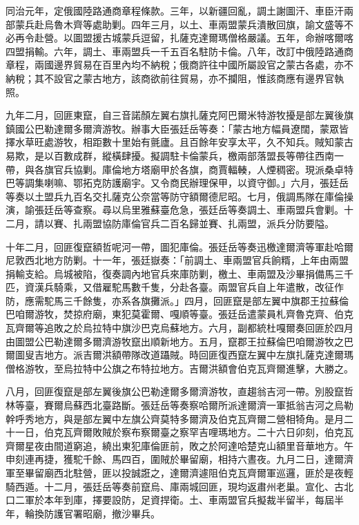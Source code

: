 \begin{pinyinscope}
同治元年，定俄國陸路通商章程條款。三年，以新疆回亂，調土謝圖汗、車臣汗兩部蒙兵赴烏魯木齊等處助剿。四年三月，以土、車兩盟蒙兵潰散回旗，諭文盛等不必再令赴營。以圖盟援古城蒙兵逗留，扎薩克達爾瑪僧格嚴議。五年，命辦喀爾喀四盟捐輸。六年，調土、車兩盟兵一千五百名駐防卡倫。八年，改訂中俄陸路通商章程，兩國邊界貿易在百里內均不納稅；俄商許往中國所屬設官之蒙古各處，亦不納稅；其不設官之蒙古地方，該商欲前往貿易，亦不攔阻，惟該商應有邊界官執照。

九年二月，回匪東竄，自三音諾顏左翼右旗扎薩克阿巴爾米特游牧擾是部左翼後旗鎮國公巴勒達爾多爾濟游牧。辦事大臣張廷岳等奏：「蒙古地方幅員遼闊，蒙眾皆擇水草旺處游牧，相距數十里始有氈廬。且百餘年安享太平，久不知兵。賊知蒙古易欺，是以百數成群，縱橫肆擾。擬調駐卡倫蒙兵，檄兩部落盟長等帶往西南一帶，與各旗官兵協剿。庫倫地方塔廟甲於各旗，商賈輻輳，人煙稠密。現派桑卓特巴等調集喇嘛、鄂拓克防護廟宇。又令商民辦理保甲，以資守御。」六月，張廷岳等奏以土盟兵九百名交扎薩克公奈當等防守額爾德尼昭。七月，俄調馬隊在庫倫操演，諭張廷岳等查察。尋以烏里雅蘇臺危急，張廷岳等奏調土、車兩盟兵會剿。十二月，請以賽、扎兩盟協防庫倫官兵二百名歸並賽、扎兩盟，派兵分防要隘。

十年二月，回匪復竄額哲呢河一帶，圖犯庫倫。張廷岳等奏迅檄達爾濟等軍赴哈爾尼敦西北地方防剿。十一年，張廷嶽奏：「前調土、車兩盟官兵餉糈，上年由兩盟捐輸支給。烏城被陷，復奏調內地官兵來庫防剿，檄土、車兩盟及沙畢捐備馬三千匹，資漢兵騎乘，又借雇駝馬數千隻，分赴各臺。兩盟官兵自上年遣散，改征作防，應需駝馬三千餘隻，亦系各旗攤派。」四月，回匪竄是部左翼中旗郡王拉蘇倫巴咱爾游牧，焚掠府廟，東犯莫霍爾、嘎順等臺。張廷岳遣蒙員札齊魯克齊、伯克瓦齊爾等追敗之於烏拉特中旗沙巴克烏蘇地方。六月，副都統杜嘎爾奏回匪於四月由圖盟公巴勒達爾多爾濟游牧竄出順新地方。五月，竄郡王拉蘇倫巴咱爾游牧之巴爾圖叟吉地方。派吉爾洪額帶隊改道躡賊。時回匪復西竄左翼中左旗扎薩克達爾瑪僧格游牧，至烏拉特中公旗之布特拉地方。吉爾洪額會伯克瓦齊爾進擊，大勝之。

八月，回匪復竄是部左翼後旗公巴勒達爾多爾濟游牧，直趨翁吉河一帶。別股竄哲林等臺，賽爾烏蘇西北臺路斷。張廷岳等奏察哈爾所派達爾濟一軍抵翁吉河之烏勒幹呼秀地方，與是部左翼中左旗公齊莫特多爾濟及伯克瓦齊爾二營相犄角。是月二十一日，伯克瓦齊爾敗賊於察布察爾臺之察罕吉哩瑪地方。二十六日卯刻，伯克瓦齊爾星夜由間道窮追，繞出東犯庫倫匪前，敗之於阿達哈楚克山額里音華地方。午申刻連再捷，獲駝千餘、馬四百，圍賊於畢留廟，相持六晝夜。九月二日，達爾濟軍至畢留廟西北駐營，匪以投誠誑之，達爾濟遽阻伯克瓦齊爾軍巡邏，匪於是夜輕騎西遁。十二月，張廷岳等奏前竄烏、庫兩城回匪，現均返肅州老巢。宣化、古北口二軍於本年到庫，擇要設防，足資捍衛。土、車兩盟官兵擬裁半留半，每屆半年，輪換防護官署昭廟，撤沙畢兵。


\end{pinyinscope}

